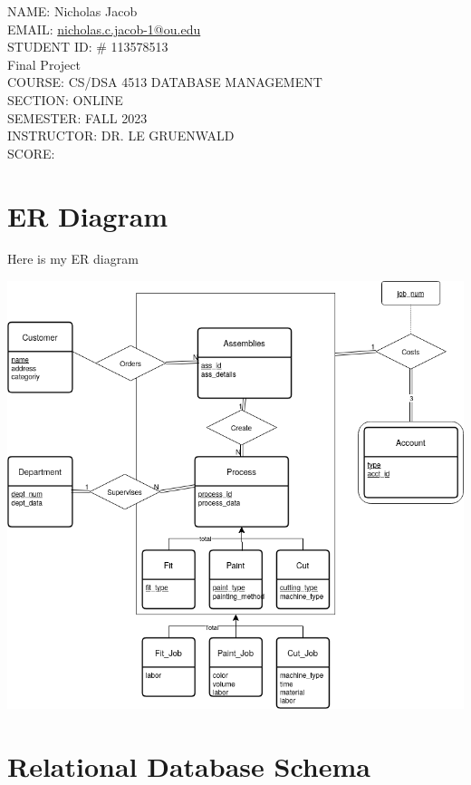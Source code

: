 \documentclass[11pt]{article}
\author{}
\title{}
\begin{document}
{\Large
\noindent NAME:  Nicholas Jacob\\ 
EMAIL: \href{mailto: nicholascjacobphd@gmail.com}{nicholas.c.jacob-1@ou.edu}\\
STUDENT ID: \# 113578513\\
Final Project\\
COURSE: CS/DSA 4513 DATABASE MANAGEMENT\\ 
SECTION: ONLINE\\SEMESTER: FALL 2023\\
INSTRUCTOR:  DR. LE GRUENWALD\\
 SCORE:}

\newpage
\tableofcontents
\newpage
{}
\setcounter{page}{1}

\section{ER Diagram}
Here is my ER diagram

\includegraphics[width=\textwidth]{Project.png}
\newpage

\section{Relational Database Schema}
\end{document}
